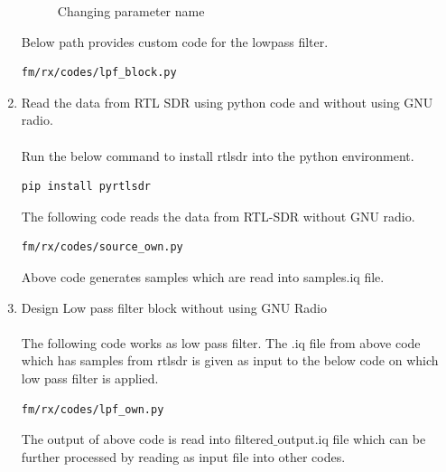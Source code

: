 \begin{enumerate}[label=\arabic*.,ref=\thesection.\theenumi]
\begin{figure}[H]
\caption{Changing parameter name}
\label{fig:changing parameter name}
\end{figure}
Below path provides custom code for the lowpass filter.
\begin{lstlisting}
fm/rx/codes/lpf_block.py
\end{lstlisting} 
\item Read the data from RTL SDR using python code and without using GNU radio.
\\
\solution \\
Run the below command to install rtlsdr into the python environment.\\
\begin{lstlisting}
pip install pyrtlsdr
\end{lstlisting}
The following code reads the data from RTL-SDR without GNU radio.
\begin{lstlisting}
fm/rx/codes/source_own.py
\end{lstlisting}
Above code generates samples which are read into samples.iq file.\\
\item Design Low pass filter block without using GNU Radio
\\
\solution \\
The following code works as low pass filter. The .iq file from above code which has samples from rtlsdr is given as input to the below code on which low pass filter is applied.\\
\begin{lstlisting}
fm/rx/codes/lpf_own.py
\end{lstlisting}
The output of above code is read into filtered$\_$output.iq file which can be further processed by reading as input file into other codes. 
\end{enumerate}